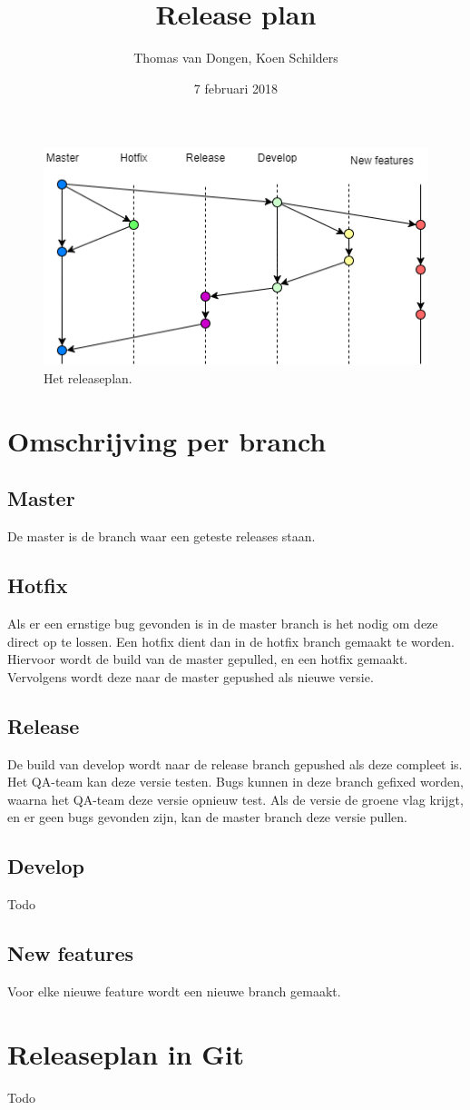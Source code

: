\documentclass[12pt]{article}
\title{Release plan}
\author{Thomas van Dongen, Koen Schilders}
\date{7 februari 2018}
\begin{document}
\begin{titlepage}
\maketitle
\end{titlepage}

\begin{figure}
	\includegraphics[width=\textwidth]{images/SOP6_Release.png}
	\caption{Het releaseplan.}
\end{figure}

\section{Omschrijving per branch}
\subsection{Master}
De master is de branch waar een geteste releases staan.
\subsection{Hotfix}
Als er een ernstige bug gevonden is in de master branch is het nodig om deze direct op te lossen. Een hotfix dient dan in de hotfix branch gemaakt te worden. Hiervoor wordt de build van de master gepulled, en een hotfix gemaakt. Vervolgens wordt deze naar de master gepushed als nieuwe versie.
\subsection{Release}
De build van develop wordt naar de release branch gepushed als deze compleet is. Het QA-team kan deze versie testen. Bugs kunnen in deze branch gefixed worden, waarna het QA-team deze versie opnieuw test. Als de versie de groene vlag krijgt, en er geen bugs gevonden zijn, kan de master branch deze versie pullen.
\subsection{Develop}
Todo
\subsection{New features}
Voor elke nieuwe feature wordt een nieuwe branch gemaakt.

\pagebreak
\section{Releaseplan in Git}
Todo
\end{document}
